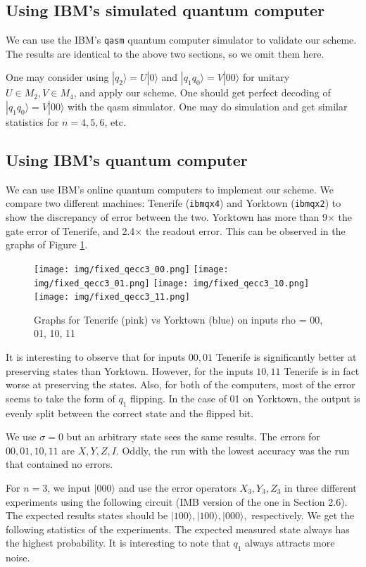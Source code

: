 \documentclass[11pt]{article}
\def\ra{{\rangle}}
\begin{document}
\subsection{Using IBM's simulated quantum computer}

We can use the IBM's \verb|qasm| quantum computer simulator to validate our scheme. The results are identical to the above two sections, so we omit them here. 

One may consider using $|q_2\ra = U|0\ra$ and  $|q_1q_0\ra = V|00\ra$
for unitary $U \in M_2, V \in M_4$, and apply our scheme.
One should get perfect decoding of $|q_1q_0\ra = V|00\ra$ with the qasm simulator. One may do simulation and get similar statistics for $n = 4,5,6$, etc.

\subsection{Using IBM's quantum computer}

We can use IBM's online quantum computers to implement our scheme. We compare two different machines: Tenerife (\verb|ibmqx4|) and Yorktown (\verb|ibmqx2|) to show the discrepancy of error between the two. Yorktown has more than 9$\times$ the gate error of Tenerife, and 2.4$\times$ the readout error. This can be observed in the graphs of Figure \ref{fig:qecc3}.

\medskip
\begin{figure}
    \centering
    \texttt{[image: img/fixed\_qecc3\_00.png]}
    \texttt{[image: img/fixed\_qecc3\_01.png]}
    \texttt{[image: img/fixed\_qecc3\_10.png]}
    \texttt{[image: img/fixed\_qecc3\_11.png]}
    \caption{Graphs for Tenerife (pink) vs Yorktown (blue) on inputs rho = 00, 01, 10, 11}
    \label{fig:qecc3}
\end{figure}

It is interesting to observe that for inputs $00, 01$ Tenerife is significantly better at preserving states than Yorktown. However, for the inputs $10, 11$ Tenerife is in fact worse at preserving the states. Also, for both of the computers, most of the error seems to take the form of $q_1$ flipping. In the case of 01 on Yorktown, the output is evenly split between the correct state and the flipped bit.

We use $\sigma = 0$ but an arbitrary state sees the same results.
The errors for $00, 01, 10, 11$ are $X, Y, Z, I$. Oddly, the run with the lowest accuracy was the run that contained no errors.

For $n = 3$, we input $|000\ra$ and use the error operators $X_3, Y_3, Z_3$ 
in three different experiments using the following circuit 
(IMB version of the one in Section 2.6). 
The expected results states should be $|100\ra, |100\ra, |000\ra,$ respectively.
We get the following statistics of the experiments.
The expected measured state always has the highest  probability.
It is interesting to note that $q_1$ always attracts more noise.
\end{document}
